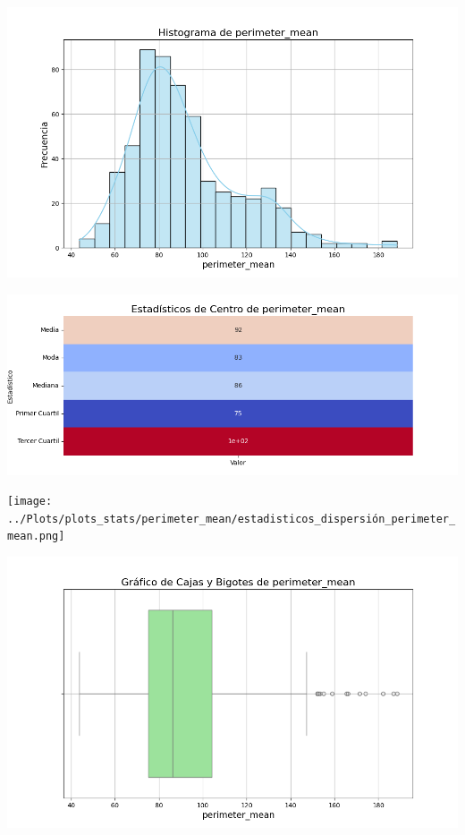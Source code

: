 \documentclass[a4paper, 12pt]{article}
\begin{document}
	\includegraphics[width=\textwidth]{../Plots/plots_stats/perimeter_mean/histograma_perimeter_mean.png}




\includegraphics[width=\textwidth]{../Plots/plots_stats/perimeter_mean/estadisticas_centro_perimeter_mean.png}




\texttt{[image: ../Plots/plots\_stats/perimeter\_mean/estadisticos\_dispersión\_perimeter\_mean.png]}



\includegraphics[width=\textwidth]{../Plots/plots_stats/perimeter_mean/boxplot_perimeter_mean.png}
\end{document}
